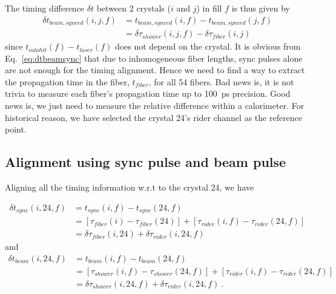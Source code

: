 \documentclass[12pt,letterpaper]{article}
\begin{document}
The timing difference $\delta t$ between 2 crystals ($i$ and $j$) in fill $f$ is thus given by
%
\begin{align}
\delta t_{beam,synced}(i,j,f) &=   t_{beam,synced}(i,f) - t_{beam,synced}(j,f) \\
                               &= \delta\tau_{shower}(i,j,f) - \delta\tau_{fiber}(i,j) \label{eq:dtbeamsync}
\end{align}
%
since $t_{calohit}(f) - t_{laser}(f)$ does not depend on the crystal. 
%
It is obvious from Eq.~\ref{eq:dtbeamsync} that due to inhomogeneous fiber lengths, sync pulses alone are not enough for the timing alignment.
Hence we need to find a way to extract the propagation time in the fiber, $t_{fiber}$, for all 54 fibers. Bad news is, it is not trivia to measure each fiber's propagation time up to 100~ps precision. Good news is, we just need to measure the relative difference within a calorimeter. For historical reason,
we have selected the crystal 24's rider channel as the reference point.

\subsection*{Alignment using sync pulse and beam pulse}

Aligning all the timing information w.r.t to the crystal 24, we have

\begin{align}
\delta t_{sync}(i,24,f)   &= t_{sync}(i,f) - t_{sync}(24,f)  \\
                         &= \left[\tau_{fiber}(i) -  \tau_{fiber}(24) \right]+ \left[\tau_{rider}(i,f) -  \tau_{rider}(24,f) \right] \\
                         &= \delta \tau_{fiber}(i,24) + \delta \tau_{rider}(i,24,f) \label{eq:tsync24}
\end{align}
%
and
%
\begin{align}
\delta t_{beam}(i,24,f)  &= t_{beam}(i,f) - t_{beam}(24,f)  \\
                         &= \left[ \tau_{shower}(i,f) -  \tau_{shower}(24,f)  \right] + \left[ \tau_{rider}(i,f) -  \tau_{rider}(24,f) \right] \\
                         &= \delta \tau_{shower}(i,24,f) + \delta \tau_{rider}(i,24,f)~.\label{eq:tbeam24}
\end{align}
\end{document}
